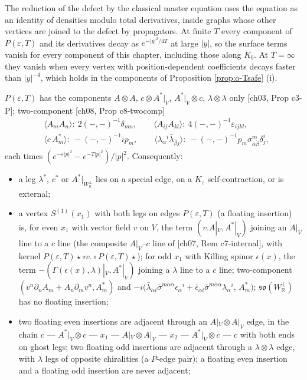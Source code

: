 The reduction of the defect by the classical master equation uses the equation as an identity of densities modulo total derivatives, inside graphs whose other vertices are joined to the defect by propagators. At finite $T$ every component of $P(\varepsilon,T)$ and its derivatives decay as $e^{-|y|^2/4T}$ at large $|y|$, so the surface terms vanish for every component of this chapter, including those along $K_b$. At $T=\infty$ they vanish when every vertex with position-dependent coefficients decays faster than $|y|^{-4}$, which holds in the components of Proposition \ref{prop:o-Tsafe} (i).

\begin{lemma}
\label{lem:o-legs}
$P(\varepsilon,T)$ has the components $A\otimes A$, $c\otimes A^*|_V$, $A^*|_V\otimes c$, $\lambda\otimes\lambda$ only [ch03, Prop c3-P]; two-component [ch08, Prop c8-twocomp]
\[
\begin{aligned}
&\langle A_mA_n\rangle:\ 2(-,-)^{-1}\delta_{mn},\qquad \langle A_{ij}A_{kl}\rangle:\ 4(-,-)^{-1}\varepsilon_{ijkl},\\
&\langle c\,A^*_m\rangle:\ -(-,-)^{-1}ip_m,\qquad \langle\lambda_\alpha{}^i\bar\lambda_{\dot\beta j}\rangle:\ -(-,-)^{-1}p_m\sigma^m_{\alpha\dot\beta}\delta^i_j ,
\end{aligned}
\]
each times $(e^{-\varepsilon|p|^2}-e^{-T|p|^2})/|p|^2$. Consequently:
\begin{itemize}
\item a leg $\lambda^*$, $c^*$ or $A^*|_{W_{\mathbb R}^\perp}$ lies on a special edge, on a $K_\varepsilon$ self-contraction, or is external;
\item a vertex $S^{(1)}(x_1)$ with both legs on edges $P(\varepsilon,T)$ (a floating insertion) is, for even $x_1$ with vector field $v$ on $V$, the term $(v.A|_V,A^*|_V)$ joining an $A|_V$ line to a $c$ line (the composite $A|_V$--$c$ line of [ch07, Rem c7-internal], with kernel $P(\varepsilon,T)\star\circ v.\circ P(\varepsilon,T)\star$); for odd $x_1$ with Killing spinor $\epsilon(x)$, the term $-(\Gamma(\epsilon(x),\lambda)|_V,A^*|_V)$ joining a $\lambda$ line to a $c$ line; two-component $(v^n\partial_nA_m+A_n\partial_mv^n,A^*_m)$ and $-i\big(\bar\lambda_{\dot\alpha i}\bar\sigma^{m\dot\alpha\alpha}\epsilon_\alpha{}^i+\bar\epsilon_{\dot\alpha i}\bar\sigma^{m\dot\alpha\alpha}\lambda_\alpha{}^i,\,A^*_m\big)$; $\mathfrak{so}(W_{\mathbb R}^\perp)$ has no floating insertion;
\item two floating even insertions are adjacent through an $A|_V\otimes A|_V$ edge, in the chain $c$ --- $A^*|_V\otimes c$ --- $x_1$ --- $A|_V\otimes A|_V$ --- $x_2$ --- $A^*|_V\otimes c$ --- $c$ with both ends on ghost legs; two floating odd insertions are adjacent through a $\lambda\otimes\lambda$ edge, with $\lambda$ legs of opposite chiralities (a $P$-edge pair); a floating even insertion and a floating odd insertion are never adjacent;

\end{itemize}
\end{lemma}
